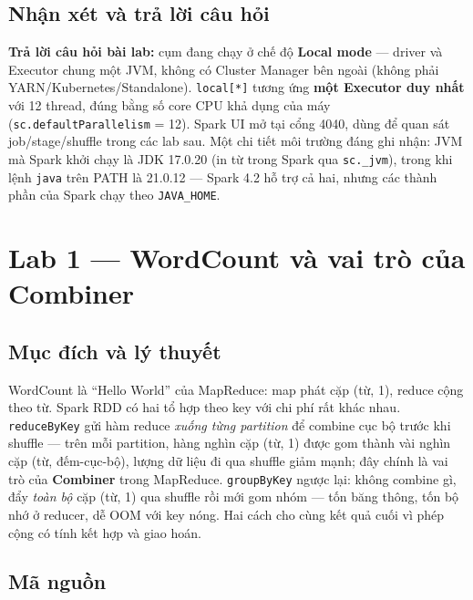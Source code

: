\documentclass[12pt,a4paper,oneside]{article}
\begin{document}
\subsection{Nhận xét và trả lời câu hỏi}

\textbf{Trả lời câu hỏi bài lab:} cụm đang chạy ở chế độ \textbf{Local mode} --- driver và Executor chung một JVM, không có Cluster Manager bên ngoài (không phải YARN/Kubernetes/Standalone). \texttt{local[*]} tương ứng \textbf{một Executor duy nhất} với 12 thread, đúng bằng số core CPU khả dụng của máy (\texttt{sc.defaultParallelism} = 12). Spark UI mở tại cổng 4040, dùng để quan sát job/stage/shuffle trong các lab sau. Một chi tiết môi trường đáng ghi nhận: JVM mà Spark khởi chạy là JDK 17.0.20 (in từ trong Spark qua \texttt{sc.\_jvm}), trong khi lệnh \texttt{java} trên PATH là 21.0.12 --- Spark 4.2 hỗ trợ cả hai, nhưng các thành phần của Spark chạy theo \texttt{JAVA\_HOME}.

\section{Lab 1 --- WordCount và vai trò của Combiner}
\label{sec:lab1}

\subsection{Mục đích và lý thuyết}

WordCount là ``Hello World'' của MapReduce: map phát cặp (từ, 1), reduce cộng theo từ. Spark RDD có hai tổ hợp theo key với chi phí rất khác nhau. \texttt{reduceByKey} gửi hàm reduce \emph{xuống từng partition} để combine cục bộ trước khi shuffle --- trên mỗi partition, hàng nghìn cặp (từ, 1) được gom thành vài nghìn cặp (từ, đếm-cục-bộ), lượng dữ liệu đi qua shuffle giảm mạnh; đây chính là vai trò của \textbf{Combiner} trong MapReduce. \texttt{groupByKey} ngược lại: không combine gì, đẩy \emph{toàn bộ} cặp (từ, 1) qua shuffle rồi mới gom nhóm --- tốn băng thông, tốn bộ nhớ ở reducer, dễ OOM với key nóng. Hai cách cho cùng kết quả cuối vì phép cộng có tính kết hợp và giao hoán.

\subsection{Mã nguồn}


\end{document}
